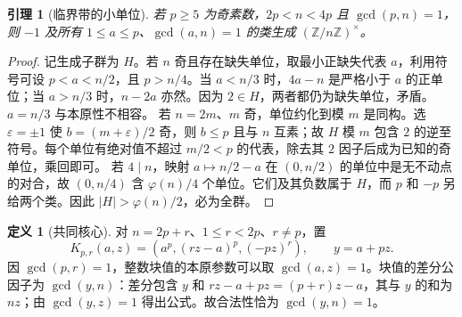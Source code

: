 \documentclass[11pt,a4paper]{article}
\newcommand{\ZZ}{\mathbb Z}
\newtheorem{lemma}[theorem]{引理}
\theoremstyle{definition}
\newtheorem{definition}[theorem]{定义}
\numberwithin{equation}{section}
\begin{document}
\begin{lemma}[临界带的小单位]\label{lem:small-units}
若 $p\ge5$ 为奇素数，$2p<n<4p$ 且 $\gcd(p,n)=1$，则 $-1$ 及所有 $1\le a\le p$、$\gcd(a,n)=1$ 的类生成 $(\ZZ/n\ZZ)^\times$。
\end{lemma}
\begin{proof}
记生成子群为 $H$。若 $n$ 奇且存在缺失单位，取最小正缺失代表 $a$，利用符号可设 $p<a<n/2$，且 $p>n/4$。当 $a<n/3$ 时，$4a-n$ 是严格小于 $a$ 的正单位；当 $a>n/3$ 时，$n-2a$ 亦然。因为 $2\in H$，两者都仍为缺失单位，矛盾。$a=n/3$ 与本原性不相容。
若 $n=2m$、$m$ 奇，单位约化到模 $m$ 是同构。选 $\varepsilon=\pm1$ 使 $b=(m+\varepsilon)/2$ 奇，则 $b\le p$ 且与 $n$ 互素；故 $H$ 模 $m$ 包含 $2$ 的逆至符号。每个单位有绝对值不超过 $m/2<p$ 的代表，除去其 $2$ 因子后成为已知的奇单位，乘回即可。
若 $4\mid n$，映射 $a\mapsto n/2-a$ 在 $(0,n/2)$ 的单位中是无不动点的对合，故 $(0,n/4)$ 含 $\varphi(n)/4$ 个单位。它们及其负数属于 $H$，而 $p$ 和 $-p$ 另给两个类。因此 $|H|>\varphi(n)/2$，必为全群。
\end{proof}

\begin{definition}[共同核心]
对 $n=2p+r$、$1\le r<2p$、$r\ne p$，置
\[
 K_{p,r}(a,z)=(a^p,(rz-a)^p,(-pz)^r),\qquad y=a+pz.
\]
因 $\gcd(p,r)=1$，整数块值的本原参数可以取 $\gcd(a,z)=1$。块值的差分公因子为 $\gcd(y,n)$：差分包含 $y$ 和 $rz-a+pz=(p+r)z-a$，其与 $y$ 的和为 $nz$；由 $\gcd(y,z)=1$ 得出公式。故合法性恰为 $\gcd(y,n)=1$。
\end{definition}
\end{document}
